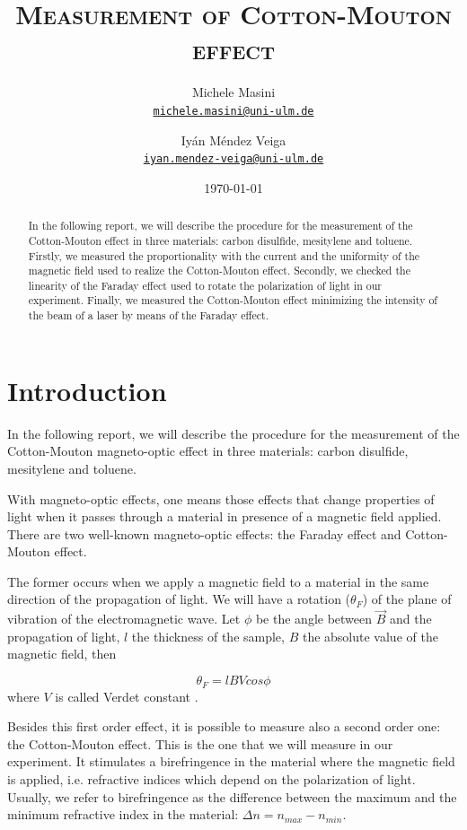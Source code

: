 \documentclass[11pt,a4paper]{article}
\title{\bfseries\textsc{Measurement of Cotton-Mouton effect}}
\author{
Michele Masini\\ \small\texttt{\href{mailto:michele.masini@uni-ulm.de}{michele.masini@uni-ulm.de}}\and
Iyán Méndez Veiga\\ \small\texttt{\href{mailto:iyan.mendez-veiga@uni-ulm.de}{iyan.mendez-veiga@uni-ulm.de}}
}
\date{\today}
\begin{document}
\maketitle

\begin{abstract}
In the following report, we will describe the procedure for the measurement of the Cotton-Mouton effect in three materials: carbon disulfide, mesitylene and toluene. Firstly, we measured the proportionality with the current and the uniformity of the magnetic field used to realize the Cotton-Mouton effect. Secondly, we checked the linearity of the Faraday effect used to rotate the polarization of light in our experiment. Finally, we measured the Cotton-Mouton effect minimizing the intensity of the beam of a laser by means of the Faraday effect.
\end{abstract}

\vspace{1.5cm}

\section{Introduction}

\vspace{.5cm}
In the following report, we will describe the procedure for the measurement of the Cotton-Mouton magneto-optic effect in three materials: carbon disulfide, mesitylene and toluene.

With magneto-optic effects, one means those effects that change properties of light when it passes through a material in presence of a magnetic field applied. There are two well-known magneto-optic effects: the Faraday effect and Cotton-Mouton effect.
	
The former occurs when we apply a magnetic field to a material in the same direction of the propagation of light. We will have a rotation ($\theta_F$) of the plane of vibration of the electromagnetic wave. Let $\phi$ be the angle between $\vec{B}$ and the propagation of light, $l$ the thickness of the sample, $B$ the absolute value of the magnetic field, then

\begin{equation}
\theta_F=lBVcos\phi\label{verd}
\end{equation}
where $V$ is called Verdet constant \cite{cappelli2003cotton}. 

Besides this first order effect, it is possible to measure also a second order one: the Cotton-Mouton effect. {\color{red}This is the one that we will measure in our experiment}. It stimulates a birefringence in the material where the magnetic field is applied, i.e. refractive indices which depend on the polarization of light. Usually, we refer to birefringence as the difference between the maximum and the minimum refractive index in the material: $\Delta n=n_{max}-n_{min}$.
\end{document}
